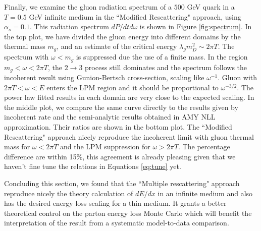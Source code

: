 \documentclass[aps, prc, reprint, amsmath, groupedaddress, nofootinbib]{revtex4-1}
\begin{document}
Finally, we examine the gluon radiation spectrum of a $500$ GeV quark in a $T = 0.5$ GeV infinite medium in the ``Modified Rescattering" approach, using $\alpha_s = 0.1$.
This radiation spectrum $dP/dtd\omega$ is shown in Figure \ref{fig:spectrum}. 
In the top plot, we have divided the gluon energy into different domains by the thermal mass $m_g$, and an estimate of the critical energy $\lambda_g m_D^2 \sim 2\pi T$.
The spectrum with $\omega < m_g$ is suppressed due the use of a finite mass.
In the region $m_g < \omega < 2\pi T$, the $2\rightarrow 3$ process still dominates and the spectrum follows the incoherent result using Gunion-Bertsch cross-section, scaling like $\omega^{-1}$.
Gluon with $2\pi T < \omega < E$ enters the LPM region and it should be proportional to $\omega^{-3/2}$.
The power law fitted results in each domain are very close to the expected scaling.
In the middle plot, we compare the same curve directly to the results given by incoherent rate and the semi-analytic results obtained in AMY NLL approximation. 
Their ratios are shown in the bottom plot.
The ``Modified Rescattering" approach nicely reproduce the incoherent limit with gluon thermal mass for $\omega < 2\pi T$ and the LPM suppression for $\omega > 2\pi T$. 
The percentage difference are within 15\%, this agreement is already pleasing given that we haven't fine tune the relations in Equations \ref{eq:tune} yet.

Concluding this section, we found that the ``Multiple rescattering" approach reproduce nicely the theory calculation of $dE/dx$ in an infinite medium and also has the desired energy loss scaling for a thin medium.
It grants a better theoretical control on the parton energy loss Monte Carlo which will benefit the interpretation of the result from a systematic model-to-data comparison.
\end{document}
